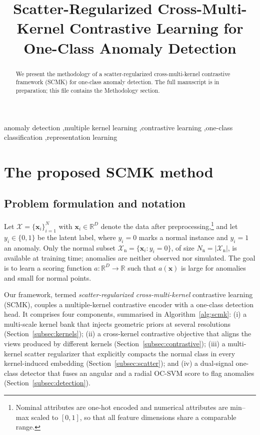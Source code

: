 \documentclass[preprint,12pt]{elsarticle}
\newcommand{\R}{\mathbb{R}}
\newcommand{\Xnorm}{\mathcal{X}_{\mathrm{n}}}
\newcommand{\xx}{\bm{x}}
\begin{document}
\begin{frontmatter}

\title{Scatter-Regularized Cross-Multi-Kernel Contrastive
Learning for One-Class Anomaly Detection}

\author{}

\begin{abstract}
We present the methodology of a scatter-regularized cross-multi-kernel
contrastive framework (SCMK) for one-class anomaly detection. The full
manuscript is in preparation; this file contains the Methodology section.
\end{abstract}

\begin{keyword}
anomaly detection \sep multiple kernel learning \sep contrastive learning
\sep one-class classification \sep representation learning
\end{keyword}

\end{frontmatter}

\section{The proposed SCMK method}
\label{sec:method}

\subsection{Problem formulation and notation}
\label{subsec:problem}

Let
$\mathcal{X}=\{\xx_i\}_{i=1}^{N}$ with $\xx_i\in\R^{D}$ denote the data after
preprocessing,\footnote{Nominal attributes are one-hot encoded and numerical
attributes are min--max scaled to $[0,1]$, so that all feature dimensions share
a comparable range.} and let $y_i\in\{0,1\}$ be the latent label, where $y_i=0$
marks a normal instance and $y_i=1$ an anomaly. Only the normal subset
$\Xnorm=\{\xx_i : y_i=0\}$, of size $N_{\mathrm{n}}=|\Xnorm|$, is available at
training time; anomalies are neither observed nor simulated. The goal is to
learn a scoring function $a:\R^{D}\!\to\!\R$ such that $a(\xx)$ is large for
anomalies and small for normal points.

Our framework, termed \emph{scatter-regularized cross-multi-kernel}
contrastive learning (SCMK), couples a multiple-kernel contrastive encoder
with a one-class detection head. It comprises four components, summarised in
Algorithm~\ref{alg:scmk}:
(i) a multi-scale kernel bank that injects geometric priors at several
resolutions (Section~\ref{subsec:kernels});
(ii) a cross-kernel contrastive objective that aligns the views produced by
different kernels (Section~\ref{subsec:contrastive});
(iii) a multi-kernel scatter regularizer that explicitly compacts the normal
class in every kernel-induced embedding (Section~\ref{subsec:scatter}); and
(iv) a dual-signal one-class detector that fuses an angular and a radial OC-SVM
score to flag anomalies (Section~\ref{subsec:detection}).
\end{document}
